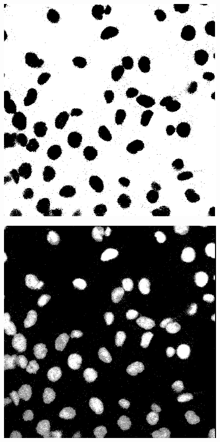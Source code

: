 \documentclass[a4paper]{article}
\begin{document}
\begin{figure}[p]
\begin{minipage}[b]{0.32\textwidth}
\centering
\includegraphics[width=1\textwidth]{gmm2}
\label{fig:gm2}
\end{minipage}%
\begin{minipage}[b]{0.32\textwidth}
\centering
\includegraphics[width=1\textwidth]{gmm3}

\end{minipage}
\end{figure}
\end{document}
